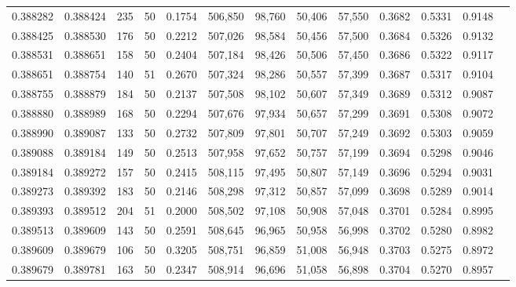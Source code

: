 \begin{tabular}{rrrrrrrrrrrrr}
0.388282 & 0.388424 &   235 &  50 &                                     0.1754 & 506,850 &  98,760 &  50,406 &  57,550 & 0.3682 & 0.5331 & 0.9148 \\
0.388425 & 0.388530 &   176 &  50 &                                     0.2212 & 507,026 &  98,584 &  50,456 &  57,500 & 0.3684 & 0.5326 & 0.9132 \\
0.388531 & 0.388651 &   158 &  50 &                                     0.2404 & 507,184 &  98,426 &  50,506 &  57,450 & 0.3686 & 0.5322 & 0.9117 \\
0.388651 & 0.388754 &   140 &  51 &                                     0.2670 & 507,324 &  98,286 &  50,557 &  57,399 & 0.3687 & 0.5317 & 0.9104 \\
0.388755 & 0.388879 &   184 &  50 &                                     0.2137 & 507,508 &  98,102 &  50,607 &  57,349 & 0.3689 & 0.5312 & 0.9087 \\
0.388880 & 0.388989 &   168 &  50 &                                     0.2294 & 507,676 &  97,934 &  50,657 &  57,299 & 0.3691 & 0.5308 & 0.9072 \\
0.388990 & 0.389087 &   133 &  50 &                                     0.2732 & 507,809 &  97,801 &  50,707 &  57,249 & 0.3692 & 0.5303 & 0.9059 \\
0.389088 & 0.389184 &   149 &  50 &                                     0.2513 & 507,958 &  97,652 &  50,757 &  57,199 & 0.3694 & 0.5298 & 0.9046 \\
0.389184 & 0.389272 &   157 &  50 &                                     0.2415 & 508,115 &  97,495 &  50,807 &  57,149 & 0.3696 & 0.5294 & 0.9031 \\
0.389273 & 0.389392 &   183 &  50 &                                     0.2146 & 508,298 &  97,312 &  50,857 &  57,099 & 0.3698 & 0.5289 & 0.9014 \\
0.389393 & 0.389512 &   204 &  51 &                                     0.2000 & 508,502 &  97,108 &  50,908 &  57,048 & 0.3701 & 0.5284 & 0.8995 \\
0.389513 & 0.389609 &   143 &  50 &                                     0.2591 & 508,645 &  96,965 &  50,958 &  56,998 & 0.3702 & 0.5280 & 0.8982 \\
0.389609 & 0.389679 &   106 &  50 &                                     0.3205 & 508,751 &  96,859 &  51,008 &  56,948 & 0.3703 & 0.5275 & 0.8972 \\
0.389679 & 0.389781 &   163 &  50 &                                     0.2347 & 508,914 &  96,696 &  51,058 &  56,898 & 0.3704 & 0.5270 & 0.8957 \\

\end{tabular}
